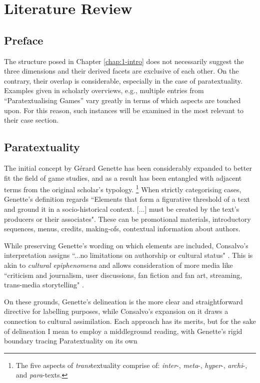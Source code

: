 \documentclass[12pt,oneside]{book}
\begin{document}
\chapter{Literature Review}

\section*{Preface}\par
The structure posed in Chapter \ref{chap:1-intro} does not necessarily suggest the three dimensions and their derived facets are exclusive of each other.
On the contrary, their overlap is considerable, especially in the case of paratextuality.
Examples given in scholarly overviews, e.g., multiple entries from ``Paratextualising Games'' \parencite{para-book-ftw} vary greatly in terms of which aspects are touched upon.
For this reason, such instances will be examined in the most relevant to their case section.

\section{Paratextuality}\par
The initial concept by G\'{e}rard Genette \parencite*{genette} has been considerably expanded to better fit the field of game studies, and as a result has been entangled with adjacent terms from the original scholar's typology.
\footnote{The five aspects of \textit{trans}textuality comprise of: \textit{inter}-, \textit{meta}-, \textit{hyper}-, \textit{archi}-, and \textit{para}-texts\parencite{chandler-semi}.}
When strictly categorising cases, Genette's definition regards 
``Elements that form a figurative threshold of a text and ground it in a socio-historical context. [...] must be created by the text’s producers or their associates".
These can be promotional materials, introductory sequences, menus, credits, making-ofs, contextual information about authors.\par
While preserving Genette's wording on which elements are included, Consalvo's interpretation assigns ``...no limitations on authorship or cultural status" \parencite*{consalvo}. 
This is akin to \textit{cultural epiphenomena} and allows consideration of more media like ``criticism and journalism, user discussions, fan fiction and fan art, streaming, trans-media storytelling" \parencite{svelch}.\par
On these grounds, Genette's delineation is the more clear and straightforward directive for labelling purposes, while Consalvo's expansion on it draws a connection to cultural assimilation.
Each approach has its merits, but for the sake of delineation I mean to employ a middleground reading, with Genette's rigid boundary tracing Paratextuality on its own
\end{document}
